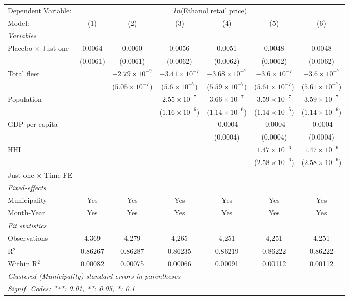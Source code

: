 \documentclass[
]{article}
\begin{document}
\begin{tabular}{lcccccc}
\tabularnewline\midrule\midrule
Dependent Variable:&\multicolumn{6}{c}{$ln$(Ethanol retail price)}\\
Model:&(1) & (2) & (3) & (4) & (5) & (6)\\
\midrule \emph{Variables}&   &   &   &   &   &  \\
Placebo $\times $ Just one & 0.0064 & 0.0060 & 0.0056 & 0.0051 & 0.0048 & 0.0048\\
  &(0.0061) & (0.0061) & (0.0062) & (0.0062) & (0.0062) & (0.0062)\\
Total fleet &    & $-2.79\times 10^{-7}$ & $-3.41\times 10^{-7}$ & $-3.68\times 10^{-7}$ & $-3.6\times 10^{-7}$ & $-3.6\times 10^{-7}$\\
  &   & ($5.05\times 10^{-7}$) & ($5.6\times 10^{-7}$) & ($5.59\times 10^{-7}$) & ($5.61\times 10^{-7}$) & ($5.61\times 10^{-7}$)\\
Population &    &    & $2.55\times 10^{-7}$ & $3.66\times 10^{-7}$ & $3.59\times 10^{-7}$ & $3.59\times 10^{-7}$\\
  &   &    & ($1.16\times 10^{-6}$) & ($1.14\times 10^{-6}$) & ($1.14\times 10^{-6}$) & ($1.14\times 10^{-6}$)\\
GDP per capita &    &    &    & -0.0004 & -0.0004 & -0.0004\\
  &   &    &    & (0.0004) & (0.0004) & (0.0004)\\
HHI &    &    &    &    & $1.47\times 10^{-6}$ & $1.47\times 10^{-6}$\\
  &   &    &    &    & ($2.58\times 10^{-6}$) & ($2.58\times 10^{-6}$)\\
Just one $\times$ Time FE &  &  &  &  &  & \\
\midrule \emph{Fixed-effects}&   &   &   &   &   &  \\
Municipality & Yes & Yes & Yes & Yes & Yes & Yes\\
Month-Year & Yes & Yes & Yes & Yes & Yes & Yes\\
\midrule \emph{Fit statistics}&  & & & & & \\
Observations & 4,369&4,279&4,265&4,251&4,251&4,251\\
R$^2$ & 0.86267&0.86287&0.86235&0.86219&0.86222&0.86222\\
Within R$^2$ & 0.00082&0.00075&0.00066&0.00091&0.00112&0.00112\\
\midrule\midrule\multicolumn{7}{l}{\emph{Clustered (Municipality) standard-errors in parentheses}}\\
\multicolumn{7}{l}{\emph{Signif. Codes: ***: 0.01, **: 0.05, *: 0.1}}\\
\end{tabular}
\end{document}
